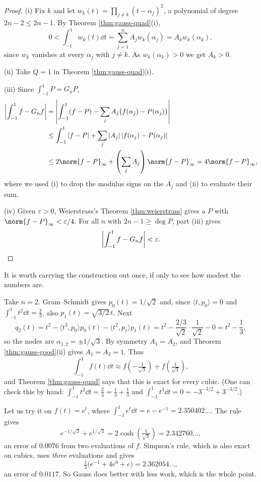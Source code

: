 \documentclass[a4paper]{scrartcl}
\begin{document}
\begin{proof}
	(i) Fix $k$ and let $w_k(t) = \prod_{j\neq k}(t-\alpha_j)^2$, a polynomial of degree $2n-2 \leq 2n-1$. By Theorem \ref{thm:gauss-quad}(i),
	$$0 < \int_{-1}^1 w_k(t)\dd t = \sum_{j=1}^n A_jw_k(\alpha_j) = A_kw_k(\alpha_k),$$
	since $w_k$ vanishes at every $\alpha_j$ with $j \neq k$. As $w_k(\alpha_k)>0$ we get $A_k>0$.

	(ii) Take $Q = 1$ in Theorem \ref{thm:gauss-quad}(i).

	(iii) Since $\int_{-1}^1 P = G_nP$,
	\begin{align*}
		\left|\int_{-1}^1 f - G_nf\right| &= \left|\int_{-1}^1(f-P) - \sum_j A_j\big(f(\alpha_j)-P(\alpha_j)\big)\right|\\
		&\leq \int_{-1}^1|f-P| + \sum_j |A_j|\,|f(\alpha_j)-P(\alpha_j)|\\
		&\leq 2\norm{f-P}_\infty + \left(\sum_j A_j\right)\norm{f-P}_\infty = 4\norm{f-P}_\infty,
	\end{align*}
	where we used (i) to drop the modulus signs on the $A_j$ and (ii) to evaluate their sum.

	(iv) Given $\varepsilon>0$, Weierstrass's Theorem \ref{thm:weierstrass} gives a $P$ with $\norm{f-P}_\infty<\varepsilon/4$. For all $n$ with $2n-1\geq\deg P$, part (iii) gives
	$$\left|\int_{-1}^1f - G_nf\right| < \varepsilon. \qedhere$$
\end{proof}

It is worth carrying the construction out once, if only to see how modest the numbers are.

\begin{example}
	Take $n = 2$. Gram--Schmidt gives $p_0(t) = 1/\sqrt2$ and, since $\langle t,p_0\rangle = 0$ and $\int_{-1}^1t^2\dd t = \tfrac23$, also $p_1(t) = \sqrt{3/2}\,t$. Next
	$$q_2(t) = t^2 - \langle t^2,p_0\rangle p_0(t)-\langle t^2,p_1\rangle p_1(t) = t^2 - \frac{2/3}{\sqrt2}\cdot\frac{1}{\sqrt2} - 0 = t^2-\frac13,$$
	so the nodes are $\alpha_{1,2} = \pm 1/\sqrt3$. By symmetry $A_1 = A_2$, and Theorem \ref{thm:gauss-good}(ii) gives $A_1=A_2=1$. Thus
	$$\int_{-1}^1 f(t)\dd t \approx f\!\left(-\tfrac{1}{\sqrt3}\right)+f\!\left(\tfrac1{\sqrt3}\right),$$
	and Theorem \ref{thm:gauss-quad} says that this is exact for every cubic. (One can check this by hand: $\int_{-1}^1t^2\dd t = \tfrac23 = \tfrac13+\tfrac13$ and $\int_{-1}^1t^3\dd t = 0 = -3^{-3/2}+3^{-3/2}$.)

	Let us try it on $f(t)=e^t$, where $\int_{-1}^1e^t\dd t = e - e^{-1} = 2.350402\ldots$. The rule gives
	$$e^{-1/\sqrt3}+e^{1/\sqrt3} = 2\cosh\!\left(\tfrac{1}{\sqrt3}\right) = 2.342760\ldots,$$
	an error of $0.0076$ from two evaluations of $f$. Simpson's rule, which is also exact on cubics, uses \emph{three} evaluations and gives
	$$\tfrac13\big(e^{-1}+4e^0+e\big) = 2.362054\ldots,$$
	an error of $0.0117$. So Gauss does better with less work, which is the whole point.
\end{example}
\end{document}
